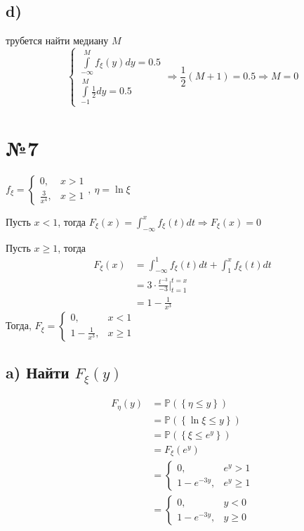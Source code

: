 \documentclass[a4paper, 10pt]{article}
\newcommand{\prob}[1]{\mathbb{P}\left(\left\{#1\right\}\right)}
\begin{document}
\subsection*{d)}
трубется найти медиану $M$
\begin{equation*}
    \begin{cases}
        \int\limits_{-\infty}^{M} f_{\xi}(y)dy = 0.5\\
        \int \limits_{-1}^{M} \frac{1}{2} dy = 0.5
    \end{cases}\Longrightarrow\frac{1}{2}(M+1)=0.5\Longrightarrow M=0
\end{equation*}

\section*{№7}
$f_{\xi} =\begin{cases}
    0,&x > 1\\
    \frac 3 {x^4},& x \geqslant 1
\end{cases},\ \eta = \ln {\xi}$
    
Пусть $x<1$, тогда $F_{\xi}(x)=\displaystyle\int_{-\infty}^{x} f_{\xi}(t)dt\Longrightarrow F_{\xi}(x)=0$

Пусть $x\geqslant1$, тогда 
\begin{equation*}
    \begin{aligned}
        F_{\xi}(x)&=\int_{-\infty}^{1}f_{\xi}(t)dt+\int_1^x f_{\xi}(t)dt\\
        &=3\cdot\frac{t^{-3}}{-3}\vert^{t=x}_{t=1}\\
        &=1-\frac{1}{x^3}
    \end{aligned}
\end{equation*}
Тогда, $F_{\xi}=\begin{cases}
    0,&x<1\\
    1-\frac{1}{x^3},&x\geqslant 1
\end{cases}$

\subsection*{a) Найти $F_{\xi}(y)$}
\begin{equation*}
    \begin{aligned}
        F_{\eta}(y)&=\prob{\eta\leqslant y}\\
        &=\prob{\ln{\xi}\leqslant y}\\
        &=\prob{\xi\leqslant e^y}\\
        &=F_{\xi}(e^y)\\
        &=\begin{cases}
            0,&e^y>1\\
            1-e^{-3y},&e^y\geqslant 1
        \end{cases}\\
        &=\begin{cases}
            0,&y<0\\
            1-e^{-3y},&y\geqslant 0
        \end{cases}
    \end{aligned}
\end{equation*}
\end{document}
